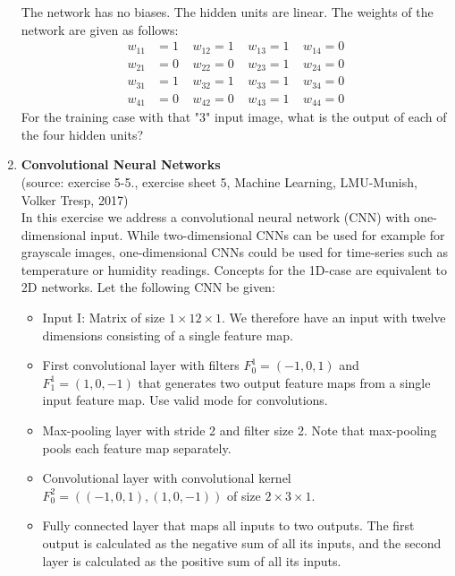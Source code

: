 \documentclass[paper=a4, fontsize=11pt]{scrartcl} %
\numberwithin{equation}{section} %
\numberwithin{figure}{section} %
\numberwithin{table}{section} %
\begin{document}
\begin{enumerate}
The network has no biases. The hidden units are linear. The weights of
the network are given as follows:
\begin{align*}
w_{11} &= 1 \;\;\;\; w_{12}=1 \;\;\;\;  w_{13}=1 \;\;\;\; w_{14}= 0 \\
w_{21} &= 0 \;\;\;\; w_{22} = 0 \;\;\;\; w_{23}= 1 \;\;\;\; w_{24}= 0 \\
w_{31} &= 1 \;\;\;\; w_{32}= 1 \;\;\;\; w_{33}= 1 \;\;\;\; w_{34} = 0 \\
 w_{41} &= 0 \;\;\;\; w_{42}=0 \;\;\;\; w_{43}= 1 \;\;\;\; w_{44}= 0
\end{align*}
For the training case with that "3" input image, what is the output
of each of the four hidden units?


\item \textbf{Convolutional Neural Networks}\\
(source: exercise 5-5., exercise sheet 5, Machine Learning, LMU-Munish, Volker Tresp, 2017)\\
In this exercise we address a convolutional neural network (CNN) with one-dimensional input. While two-dimensional CNNs can be used for example for grayscale images, one-dimensional CNNs could be used for
time-series such as temperature or humidity readings. Concepts for the 1D-case are equivalent to 2D networks.
Let the following CNN be given:
\begin{itemize}
\item Input I: Matrix of size $1\times12\times1$. We therefore have an input with twelve dimensions consisting of a single feature map.
\item First convolutional layer with filters $F_0^1=(-1,0,1)$ and
$F_1^1=(1,0,-1)$ that generates two output feature maps from a single input feature map. Use valid mode for convolutions.
\item  Max-pooling layer with stride 2 and filter size 2. Note that max-pooling pools each feature map separately.
\item Convolutional layer with convolutional kernel $F_0^2= ((-1,0,1),(1,0,-1))$ of size $2\times3\times1$.
\item Fully connected layer that maps all inputs to two outputs. The first output is calculated as the negative sum of all its inputs, and the second layer is calculated as the positive sum of all its inputs.

\end{itemize}
\end{enumerate}
\end{document}
